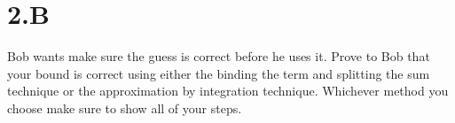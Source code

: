 \section{2.B}
    Bob wants make sure the guess is correct before he uses it. Prove to Bob that your bound is correct using either the binding the term and splitting the sum technique or the approximation by integration technique. Whichever method you choose make sure to show all of your steps.